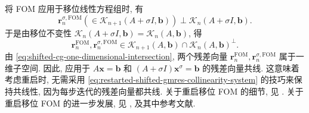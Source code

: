 {\leavevmode{}\label{idx:chapter-04-section-04:restarted-shifted-fom}将 FOM 应用于移位线性方程组时, 有}
\[\bm r_n^{\sigma,\mathrm{FOM}}(\in\mathcal K_{n+1}(A+\sigma I,\bm b))\perp\mathcal K_n(A+\sigma I,\bm b).\]
{于是由移位不变性 $\mathcal K_n(A+\sigma I,\bm b)=\mathcal K_n(A,\bm b)$, 得}
\[\bm r_n^{\mathrm{FOM}},\bm r_n^{\sigma,\mathrm{FOM}}\in\mathcal K_{n+1}(A,\bm b)\cap\mathcal K_n(A,\bm b)^{\perp}.\]
{由 \eqref{eq:shifted-cg-one-dimensional-intersection}, 两个残差向量 $\bm r_n^{\mathrm{FOM}},\bm r_n^{\sigma,\mathrm{FOM}}$ 属于一维子空间. 因此, 应用于 $A\bm x=\bm b$ 和 $(A+\sigma I)\bm x^{\sigma}=\bm b$ 的残差向量共线. 这意味着考虑重启时, 无需采用 \eqref{eq:restarted-shifted-gmres-collinearity-system} 的技巧来保持共线性, 因为每步迭代的残差向量都共线. 关于重启移位 FOM 的细节, 见 . 关于重启移位 FOM 的进一步发展, 见 ,  及其中参考文献.}
